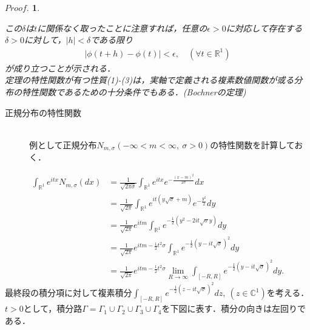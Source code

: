 \documentclass[a4j,papersize,disablejfam,slide,14pt]{jsarticle}
\newtheorem{Proof}{$Proof.$}
\def\exp#1{e^{#1}} %
\begin{document}
\begin{Proof}
\begin{description}
            この$\delta$は$t$に関係なく取ったことに注意すれば，任意の$\epsilon > 0$に対応して存在する$\delta > 0$に対して，$|h| < \delta$である限り
            \begin{align}
            	\left| \phi(t+h) - \phi(t) \right| < \epsilon, \quad (\forall t \in \mathbb{R}^1)
            \end{align}
            が成り立つことが示される．\\
            定理の特性関数が有つ性質(1)-(3)は，実軸で定義される複素数値関数が或る分布の特性関数であるための十分条件でもある．({\rm Bochner}の定理)
        \end{description}
    \end{Proof}
    
    \begin{screen}
    	\begin{description}
        	\item[正規分布の特性関数]\mbox{}\\
    			例として正規分布$N_{m,\sigma} (-\infty < m < \infty,\ \sigma > 0)$の特性関数を計算しておく．
        \end{description}
    \end{screen}
    
    \begin{align}
    	\int_{\mathbb{R}^1} \exp{itx} N_{m,\sigma} (dx) &= \frac{1}{\sqrt{2\pi \sigma}} \int_{\mathbb{R}^1} \exp{itx} \exp{-\frac{(x-m)^2}{2\sigma}} dx \\
        &= \frac{1}{\sqrt{2\pi}} \int_{\mathbb{R}^1} \exp{it(y\sqrt{\sigma}+m)} \exp{-\frac{y^2}{2}} dy \\
        &= \frac{1}{\sqrt{2\pi}} \exp{itm} \int_{\mathbb{R}^1} \exp{-\frac{1}{2} (y^2 - 2it\sqrt{\sigma}y)} dy \\
        &= \frac{1}{\sqrt{2\pi}} \exp{itm-\frac{1}{2} t^2\sigma} \int_{\mathbb{R}^1} \exp{-\frac{1}{2} (y - it\sqrt{\sigma})^2} dy \\
        &= \frac{1}{\sqrt{2\pi}} \exp{itm-\frac{1}{2} t^2\sigma} \lim_{R \to \infty} \int_{[-R,R]} \exp{-\frac{1}{2} (y - it\sqrt{\sigma})^2} dy.
    \end{align}
    最終段の積分項に対して複素積分$\int_{[-R,R]} \exp{-\frac{1}{2} (z - it\sqrt{\sigma})^2} dz,\ (z \in \mathbb{C}^1)$を考える．
    $t > 0$として，積分路$\Gamma = \Gamma_1 \cup \Gamma_2 \cup \Gamma_3 \cup \Gamma_4$を下図に表す．積分の向きは左回りである．
    
\end{document}

